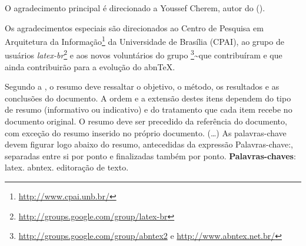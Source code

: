 \documentclass[
	12pt,				%
	openright,			%
	twoside,			%
	a4paper,			%
	english,			%
	french,				%
	spanish,			%
	brazil,				%
]{abntex2}
\begin{document}

\frenchspacing 


\imprimircapa

\imprimirfolhaderosto*

\begin{agradecimentos}
  O agradecimento principal é direcionado a Youssef Cherem, autor do
  ().
  
  Os agradecimentos especiais são direcionados ao Centro de Pesquisa em
  Arquitetura da Informação\footnote{\url{http://www.cpai.unb.br/}} da
  Universidade de Brasília (CPAI), ao grupo de usuários
  \emph{latex-br}\footnote{\url{http://groups.google.com/group/latex-br}}
  e aos novos voluntários do grupo
  \emph{\abnTeX}\footnote{\url{http://groups.google.com/group/abntex2} e
  \url{http://www.abntex.net.br/}}\textasciitilde{}que contribuíram e que
  ainda contribuirão para a evolução do abn\TeX.
\end{agradecimentos}


\setlength{\absparsep}{18pt} %
\begin{resumo}
 Segundo a \citeonline{} , o resumo
 deve ressaltar o objetivo, o método, os resultados e as conclusões do
 documento. A ordem e a extensão destes itens dependem do tipo de resumo
 (informativo ou indicativo) e do tratamento que cada item recebe no
 documento original. O resumo deve ser precedido da referência do
 documento, com exceção do resumo inserido no próprio documento. (\ldots)
 As palavras-chave devem figurar logo abaixo do resumo, antecedidas da
 expressão Palavras-chave:, separadas entre si por ponto e finalizadas
 também por ponto.
 \noindent
 \textbf{Palavras-chaves}: latex. abntex. editoração de texto.
\end{resumo}

\listoffigures*
\cleardoublepage
\end{document}
